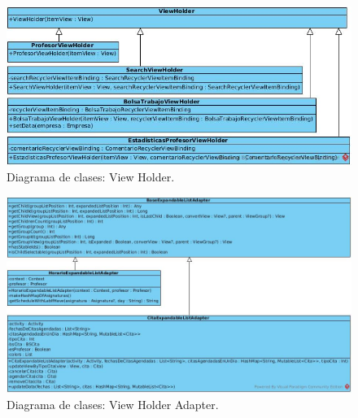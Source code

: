 \begin{figure}[!htpb]
	\hypertarget{fig:clasesViewHolder}{\hspace{1pt}}
	\begin{center}
		\includegraphics[width=1\textwidth]{images/clases/ViewHolder}
		\caption{Diagrama de clases: View Holder.}
		\label{fig:clasesViewHolder}
	\end{center}
\end{figure}

\begin{figure}[!htpb]
	\hypertarget{fig:clasesViewHolderAdapter}{\hspace{1pt}}
	\begin{center}
		\includegraphics[width=1\textwidth]{images/clases/ViewHolderAdapterExpandable}
		\caption{Diagrama de clases: View Holder Adapter.}
		\label{fig:clasesViewHolderAdapter}
	\end{center}
\end{figure}

